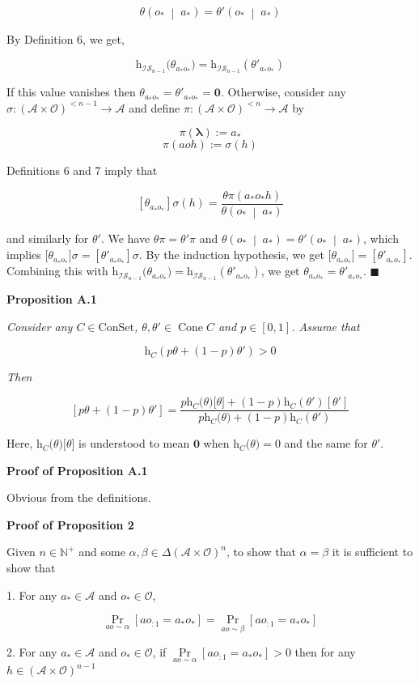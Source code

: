 \documentclass[a4paper]{article}
\newcommand{\Co}[1]{}
\newcommand{\AP}[1]{\left(#1\right)}
\newcommand{\AB}[1]{\left[#1\right]}
\newcommand{\APM}[2]{\left(#1\;\middle\vert\;#2\right)}
\newcommand{\Pa}[2]{\underset{#1}{\operatorname{Pr}}\AB{#2}}
\newcommand{\Nats}{\mathbb{N}}
\newcommand{\Estr}{\boldsymbol{\lambda}}
\newcommand{\A}{\mathcal{A}}
\newcommand{\Ob}{\mathcal{O}}
\newcommand{\AO}{\AP{\A\times\Ob}}
\newcommand{\Con}{{\boldsymbol{\mathrm{ConSet}}}}
\DeclareMathOperator{\Cone}{Cone}
\newcommand{\Ht}{\mathrm{h}}
\newcommand{\IS}{\mathcal{IS}}
\begin{document}
$$\theta\APM{o_*}{a_*}=\theta'\APM{o_*}{a_*}$$

By Definition 6, we get,

$$\Ht_{\IS_{n-1}}\big(\theta_{a_*o_*}\big)=\Ht_{\IS_{n-1}}\AP{\theta'_{a_*o_*}}$$

If this value vanishes then $\theta_{a_*o_*}=\theta'_{a_*o_*}=\boldsymbol{0}$. Otherwise, consider any $\sigma:\AO^{<n-1}\rightarrow\A$ and define $\pi:\AO^{<n}\rightarrow\A$ by

$$\pi(\Estr):=a_*$$
$$\pi(aoh):=\sigma(h)$$

Definitions 6 and 7 imply that

$$\AB{\theta_{a_*o_*}}\sigma(h)=\frac{\theta\pi(a_*o_*h)}{\theta\APM{o_*}{a_*}}$$

and similarly for $\theta'$. We have $\theta\pi=\theta'\pi$ and $\theta\APM{o_*}{a_*}=\theta'\APM{o_*}{a_*}$, which implies $\Big[\theta_{a_*o_*}\Big]\sigma=\AB{\theta'_{a_*o_*}}\sigma$. By the induction hypothesis, we get $\big[\theta_{a_*o_*}\big]=\AB{\theta'_{a_*o_*}}$. Combining this with $\Ht_{\IS_{n-1}}\big(\theta_{a_*o_*}\big)=\Ht_{\IS_{n-1}}\AP{\theta'_{a_*o_*}}$, we get $\theta_{a_*o_*}=\theta'_{a_*o_*}$. $\blacksquare$

\textbf{Proposition A.1}\Co{b}

\textit{Consider any $C\in\Con$, $\theta,\theta'\in\Cone{C}$ and $p\in[0,1]$. Assume that}\Co{i} 

$$\Ht_C\AP{p\theta+(1-p)\theta'}>0$$

\textit{Then}\Co{i}

$$\AB{p\theta+(1-p)\theta'}=\frac{p\Ht_C\big(\theta\big)\big[\theta\big]+(1-p)\Ht_C\AP{\theta'}\AB{\theta'}}{p\Ht_C\big(\theta\big)+(1-p)\Ht_C\AP{\theta'}}$$

Here, $\Ht_C\big(\theta\big)\big[\theta\big]$ is understood to mean $\boldsymbol{0}$ when $\Ht_C\big(\theta\big)=0$ and the same for $\theta'$.

\textbf{Proof of Proposition A.1}\Co{b}

Obvious from the definitions.

\textbf{Proof of Proposition 2}\Co{b}

Given $n\in\Nats^+$ and some $\alpha,\beta\in\Delta\AO^n$, to show that $\alpha=\beta$ it is sufficient to show that

1. For any $a_*\in\A$ and $o_*\in\Ob$, 

$$\Pa{ao\sim\alpha}{ao_{:1}=a_*o_*}=\Pa{ao\sim\beta}{ao_{:1}=a_*o_*}$$

2. For any $a_*\in\A$ and $o_*\in\Ob$, if $\Pa{ao\sim\alpha}{ao_{:1}=a_*o_*}>0$ then for any $h\in\AO^{n-1}$
\end{document}
